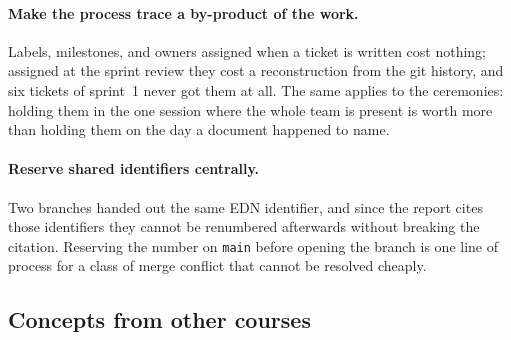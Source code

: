 \paragraph{Make the process trace a by-product of the work.}
Labels, milestones, and owners assigned when a ticket is written cost nothing; assigned at the sprint review they cost a reconstruction from the git history, and six tickets of sprint~1 never got them at all.
The same applies to the ceremonies: holding them in the one session where the whole team is present is worth more than holding them on the day a document happened to name.

\paragraph{Reserve shared identifiers centrally.}
Two branches handed out the same EDN identifier, and since the report cites those identifiers they cannot be renumbered afterwards without breaking the citation.
Reserving the number on \texttt{main} before opening the branch is one line of process for a class of merge conflict that cannot be resolved cheaply.


\subsection{Concepts from other courses}
\label{sec:retro-courses}

